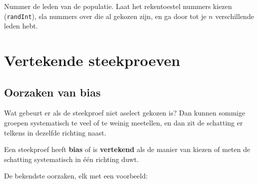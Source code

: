 
\begin{werkwijze}
Nummer de leden van de populatie. Laat het rekentoestel nummers kiezen (\texttt{randInt}), sla nummers over die al gekozen zijn, en ga door tot je $n$ verschillende leden hebt.
\end{werkwijze}

\begin{oefeningen}
\end{oefeningen}

\section{Vertekende steekproeven}

\subsection{Oorzaken van bias}

Wat gebeurt er als de steekproef niet aselect gekozen is? Dan kunnen sommige groepen systematisch te veel of te weinig meetellen, en dan zit de schatting er telkens in dezelfde richting naast.

\begin{theorie}
Een steekproef heeft \textbf{\textcolor{accent}{bias}} of is \textbf{\textcolor{accent}{vertekend}} als de manier van kiezen of meten de schatting systematisch in één richting duwt.
\end{theorie}

De bekendste oorzaken, elk met een voorbeeld:

